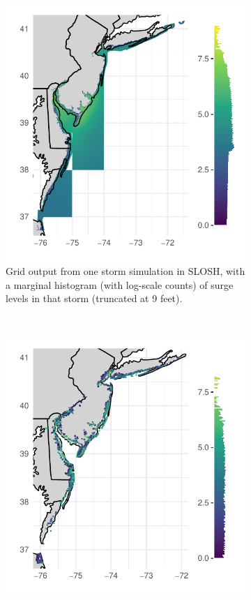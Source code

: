 \begin{figure}[t!]
    \centering
    \begin{subfigure}[t]{0.48\textwidth}
        \centering
        \includegraphics[width=0.99\linewidth]{./plots/slosh1run_loghist}
        \caption{Grid output from one storm simulation in SLOSH, with a marginal
            histogram (with log-scale counts) of surge levels in that storm 
            (truncated at 9 feet).\label{fig:slosh1run}}
    \end{subfigure}%
    ~ 
    \begin{subfigure}[t]{0.48\textwidth}
        \centering
        \includegraphics[width=0.99\linewidth]{./plots/sloshthreshold_loghist}

\end{subfigure}
\end{figure}
